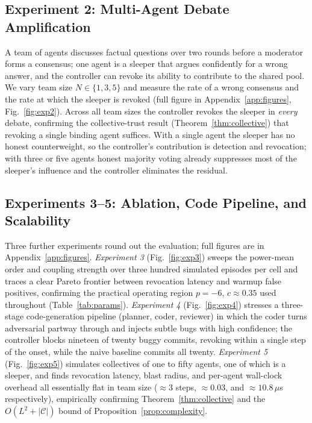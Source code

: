 \documentclass[sigconf,anonymous]{acmart}
\theoremstyle{plain}
\theoremstyle{definition}
\theoremstyle{remark}
\begin{document}
\subsection{Experiment 2: Multi-Agent Debate Amplification}
\label{sec:exp2}
A team of agents discusses factual questions over two rounds before a moderator forms a
consensus; one agent is a sleeper that argues confidently for a wrong answer, and the
controller can revoke its ability to contribute to the shared pool. We vary team size
$N\in\{1,3,5\}$ and measure the rate of a wrong consensus and the rate at which the
sleeper is revoked (full figure in Appendix~\ref{app:figures}, Fig.~\ref{fig:exp2}).
Across all team sizes the controller revokes the sleeper in \emph{every} debate,
confirming the collective-trust result (Theorem~\ref{thm:collective}) that revoking a
single binding agent suffices. With a single agent the sleeper has no honest
counterweight, so the controller's contribution is detection and revocation; with three
or five agents honest majority voting already suppresses most of the sleeper's influence
and the controller eliminates the residual.

\subsection{Experiments 3--5: Ablation, Code Pipeline, and Scalability}
\label{sec:exp345}
Three further experiments round out the evaluation; full figures are in
Appendix~\ref{app:figures}. \emph{Experiment 3} (Fig.~\ref{fig:exp3}) sweeps the
power-mean order and coupling strength over three hundred simulated episodes per cell and
traces a clear Pareto frontier between revocation latency and warmup false positives,
confirming the practical operating region $p=-6$, $c\approx0.35$ used throughout
(Table~\ref{tab:params}). \emph{Experiment 4} (Fig.~\ref{fig:exp4}) stresses a three-stage
code-generation pipeline (planner, coder, reviewer) in which the coder turns adversarial
partway through and injects subtle bugs with high confidence; the controller blocks
nineteen of twenty buggy commits, revoking within a single step of the onset, while the
naive baseline commits all twenty. \emph{Experiment 5} (Fig.~\ref{fig:exp5}) simulates
collectives of one to fifty agents, one of which is a sleeper, and finds revocation
latency, blast radius, and per-agent wall-clock overhead all essentially flat in team size
($\approx\!3$ steps, $\approx\!0.03$, and $\approx\!10.8\,\mu$s respectively), empirically
confirming Theorem~\ref{thm:collective} and the $O(L^2+|\mathcal{C}|)$ bound of
Proposition~\ref{prop:complexity}.
\end{document}
